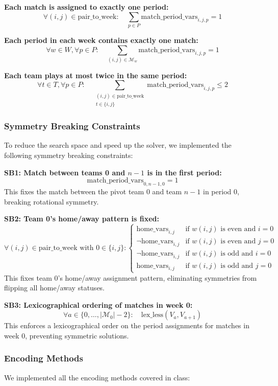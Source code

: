 \documentclass{article}
\begin{document}
\textbf{Each match is assigned to exactly one period:}
\[
\forall (i,j) \in \text{pair\_to\_week}: \quad \sum_{p \in P} \text{match\_period\_vars}_{i,j,p} = 1
\]

\textbf{Each period in each week contains exactly one match:}
\[
\forall w \in W, \forall p \in P: \quad \sum_{(i,j) \in \mathcal{M}_w} \text{match\_period\_vars}_{i,j,p} = 1
\]

\textbf{Each team plays at most twice in the same period:}
\[
\forall t \in T, \forall p \in P: \quad \sum_{\substack{(i,j) \in \text{pair\_to\_week} \\ t \in \{i,j\}}} \text{match\_period\_vars}_{i,j,p} \leq 2
\]

\subsubsection*{Symmetry Breaking Constraints}
To reduce the search space and speed up the solver, we implemented the following symmetry breaking constraints:

\textbf{SB1: Match between teams 0 and $n-1$ is in the first period:}
\[
\text{match\_period\_vars}_{0,n-1,0} = 1
\]
This fixes the match between the pivot team 0 and team $n-1$ in period 0, breaking rotational symmetry.

\textbf{SB2: Team 0's home/away pattern is fixed:}
\[
\forall (i,j) \in \text{pair\_to\_week} \text{ with } 0 \in \{i,j\}:
\begin{cases}
\text{home\_vars}_{i,j} & \text{if } w(i,j) \text{ is even and } i=0 \\
\neg \text{home\_vars}_{i,j} & \text{if } w(i,j) \text{ is even and } j=0 \\
\neg \text{home\_vars}_{i,j} & \text{if } w(i,j) \text{ is odd and } i=0 \\
\text{home\_vars}_{i,j} & \text{if } w(i,j) \text{ is odd and } j=0
\end{cases}
\]
This fixes team 0's home/away assignment pattern, eliminating symmetries from flipping all home/away statuses.

\textbf{SB3: Lexicographical ordering of matches in week 0:}
\[
\forall a \in \{0, \dots, |\mathcal{M}_0| - 2\}: \quad \text{lex\_less}(V_a, V_{a+1})
\]
This enforces a lexicographical order on the period assignments for matches in week 0, preventing symmetric solutions.

\subsubsection*{Encoding Methods}
We implemented all the encoding methods covered in class:
\end{document}
